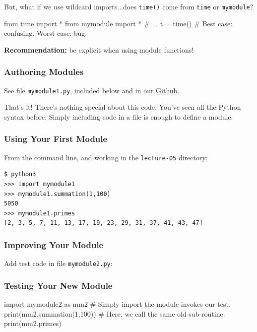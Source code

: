 \documentclass[12pt,letterpaper,twoside]{article}
\begin{document}
But, what if we use wildcard imports...does \texttt{time()} come from \texttt{time} or \texttt{mymodule}?

\begin{python}
from time import *
from mymodule import *
# ...
t = time()   # Best case: confusing. Worst case: bug.
\end{python}

\textbf{Recommendation:} be explicit when using module functions!

\subsubsection{Authoring Modules}

See file \texttt{mymodule1.py}, included below and in our 
\href{https://github.com/CME211/notes/blob/fall_18/lecture-05/mymodule1.py}{Github}.



That's it! There's nothing special about this code. You've seen all the Python syntax before.
Simply including code in a file is enough to define a module.

\subsubsection{Using Your First Module}

From the command line, and working in the \texttt{lecture-05} directory:

\begin{verbatim}
$ python3
>>> import mymodule1
>>> mymodule1.summation(1,100)
5050
>>> mymodule1.primes
[2, 3, 5, 7, 11, 13, 17, 19, 23, 29, 31, 37, 41, 43, 47]
\end{verbatim}

\subsubsection{Improving Your Module}

Add test code in file \texttt{mymodule2.py}:



\subsubsection{Testing Your New Module}

\begin{python}
import mymodule2 as mm2      # Simply import the module invokes our test.
print(mm2.summation(1,100))  # Here, we call the same old sub-routine.
print(mm2.primes)            
\end{python}
\end{document}
